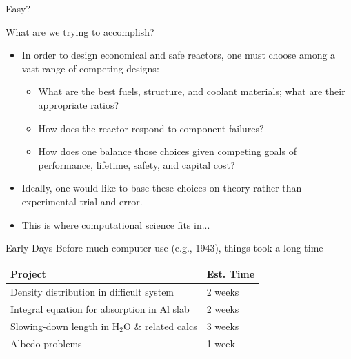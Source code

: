 \documentclass[xcolor=x11names,compress]{beamer}
\renewcommand{\(}{\begin{columns}}
\renewcommand{\)}{\end{columns}}
\newcommand{\<}[1]{\begin{column}{#1}}
\renewcommand{\>}{\end{column}}
\begin{document}
\begin{frame}{Easy?}
 \begin{figure}
   \begin{center}
   \end{center}
 \end{figure}
\end{frame}

\begin{frame}{What are we trying to accomplish?}
\begin{itemize}
\item In order to design economical and safe reactors, one must choose among a vast range of competing designs:
\begin{itemize}
\item What are the best fuels, structure, and coolant materials; what are their appropriate ratios?
\item How does the reactor respond to component failures?
\item How does one balance those choices given competing goals of performance, lifetime, safety, and capital cost?
\end{itemize}
\item Ideally, one would like to base these choices on theory rather than experimental trial and error.
\item This is where \textcolor{dgreen}{computational science} fits in...
\end{itemize}
\end{frame}

\begin{frame}{Early Days}
Before much computer use (e.g., 1943), things took a long time
\begin{tabu}{|X | l|}
\hline
Project & Est. Time \\\hline
Density distribution in difficult system & 2 weeks \\
Integral equation for absorption in Al slab & 2 weeks \\
Slowing-down length in H$_2$O \& related calcs & 3 weeks \\
Albedo problems & 1 week \\\hline
\end{tabu}
\begin{center}
\end{center}
\end{frame}
\end{document}
